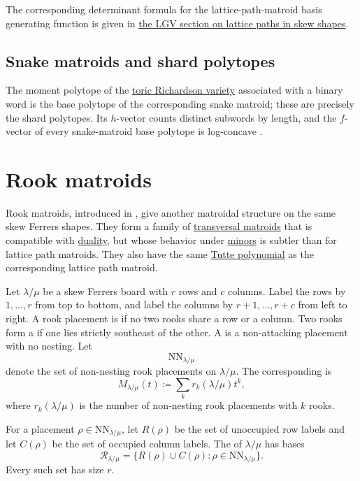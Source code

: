 The corresponding determinant formula for the lattice-path-matroid basis
generating function is given in \hyperref[LGVLatticePathsInSkewShape]{the LGV
section on lattice paths in skew shapes}.


\subsection[snakeMatroidShardPolytopes]{Snake matroids and shard polytopes}

The moment polytope of the
\hyperref[qsymToricRichardsonGeometry]{toric Richardson variety} associated
with a binary word is the base polytope of the corresponding snake matroid;
these are precisely the shard polytopes.  Its $h$-vector counts distinct
subwords by length, and the $f$-vector of every snake-matroid base polytope is
log-concave \cite[Thm.~V and Cor.~VI]{GonzalesLeLowen2026x}.


\section[rookMatroids]{Rook matroids}

Rook matroids, introduced in \cite{AlexanderssonJal2024x}, give another
matroidal structure on the same skew Ferrers shapes. They form a family of
\hyperref[transversalMatroids]{transversal matroids} that is compatible with
\hyperref[matroidDuality]{duality}, but whose behavior under
\hyperref[matroidMinors]{minors} is subtler than for lattice path matroids.
They also have the same \hyperref[tuttePolynomial]{Tutte polynomial} as the
corresponding lattice path matroid.

Let $\lambda/\mu$ be a skew Ferrers board with $r$ rows and $c$ columns.
Label the rows by $1,\dotsc,r$ from top to bottom, and label the columns by
$r+1,\dotsc,r+c$ from left to right. A rook placement is
\label{nonAttackingRookPlacement} if no two rooks share a
row or a column. Two rooks form a \label{rookNesting} if one
lies strictly southeast of the other. A 
\label{nonNestingRookPlacement} is a non-attacking placement with no nesting.
Let
\[
  \mathrm{NN}_{\lambda/\mu}
\]
denote the set of non-nesting rook placements on $\lambda/\mu$.
The corresponding 
\label{nonNestingRookPolynomial} is
\[
  M_{\lambda/\mu}(t) \coloneqq \sum_k r_k(\lambda/\mu)t^k,
\]
where $r_k(\lambda/\mu)$ is the number of non-nesting rook placements with $k$
rooks.

For a placement $\rho \in \mathrm{NN}_{\lambda/\mu}$, let $R(\rho)$ be the set
of unoccupied row labels and let $C(\rho)$ be the set of occupied column labels.
The \label{rookMatroidDefinition} of $\lambda/\mu$ has
bases
\[
  \mathcal{R}_{\lambda/\mu}
  =
  \{ R(\rho) \cup C(\rho) : \rho \in \mathrm{NN}_{\lambda/\mu} \}.
\]
Every such set has size $r$.

